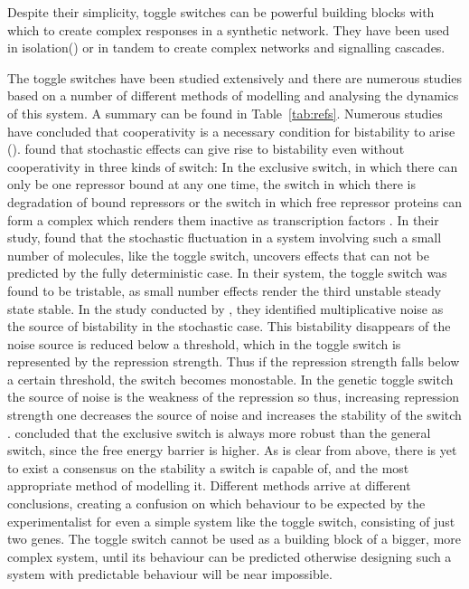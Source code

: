 Despite their simplicity, toggle switches can be powerful building blocks with which to create complex responses in a synthetic network. They have been used in isolation() or in tandem to create complex networks and signalling cascades. 

The toggle switches have been studied extensively and there are numerous studies based on a number of different methods of modelling and analysing the dynamics of this system. A summary can be found in Table~\ref{tab:refs}. Numerous studies have concluded that cooperativity is a necessary condition for bistability to arise (). \textcite{Lipshtat:2006wb} found that stochastic effects can give rise to bistability even without cooperativity in three kinds of switch: In the exclusive switch, in which there can only be one repressor bound at any one time, the switch in which there is degradation of bound repressors or the switch in which free repressor proteins can form a complex which renders them inactive as transcription factors \autocite{Lipshtat:2006wb}. In their study, \textcite{Ma:2012dt} found that the stochastic fluctuation in a system involving such a small number of molecules, like the toggle switch, uncovers effects that can not be predicted by the fully deterministic case. In their system, the toggle switch was found to be tristable, as small number effects render the third unstable steady state stable. In the study conducted by \textcite{Biancalani:2015vy}, they identified multiplicative noise as the source of bistability in the stochastic case. This bistability disappears of the noise source is reduced below a threshold, which in the toggle switch is represented by the repression strength. Thus if the repression strength falls below a certain threshold, the switch becomes monostable. In the genetic toggle switch the source of noise is the weakness of the repression so thus, increasing repression strength one decreases the source of noise and increases the stability of the switch \autocite{Warren:2005kea}. \textcite{Warren:2005kea} concluded that the exclusive switch is always more robust than the general switch, since the free energy barrier is higher. As is clear from above, there is yet to exist a consensus on the stability a switch is capable of, and the most appropriate method of modelling it. Different methods arrive at different conclusions, creating a confusion on which behaviour to be expected by the experimentalist for even a simple system like the toggle switch, consisting of just two genes. The toggle switch cannot be used as a building block of a bigger, more complex system, until its behaviour can be predicted otherwise designing such a system with predictable behaviour will be near impossible.


